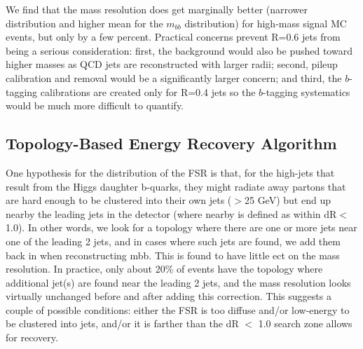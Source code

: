 We find that the mass resolution does get marginally better (narrower distribution and higher mean
for the $m_{bb}$ distribution) for high-mass signal MC events, but only by a few percent.
Practical concerns prevent R=0.6 jets from being a serious consideration: first, the background
would also be pushed toward higher masses as QCD jets are reconstructed with larger radii;
second, pileup calibration and removal would be a significantly larger concern; and third,
the $b$-tagging calibrations are created only for R=0.4 jets so the $b$-tagging systematics
would be much more difficult to quantify.  


\subsection{Topology-Based Energy Recovery Algorithm}
 One hypothesis for the distribution of the FSR is that, for the high-\pt jets that result from the Higgs
 daughter b-quarks, they might radiate away partons that are hard enough to be clustered into their own
 jets (\pt$>$25 GeV) but end up nearby the leading jets in the detector (where nearby is defined as within
 dR$<$1.0). In other words, we look for a topology where there are one or more jets near one of the leading
2 jets, and in cases where such jets are found, we add them back in when reconstructing mbb.
 This is found to have little ect on the mass resolution. In practice, only about 20\% of events
 have the topology where additional jet(s) are found near the leading 2 jets, and the mass resolution
 looks virtually unchanged before and after adding this correction. This suggests a couple of possible
 conditions: either the FSR is too diffuse and/or low-energy to be clustered into jets, and/or it is farther
 than the dR $<$ 1.0 search zone allows for recovery. 
    

